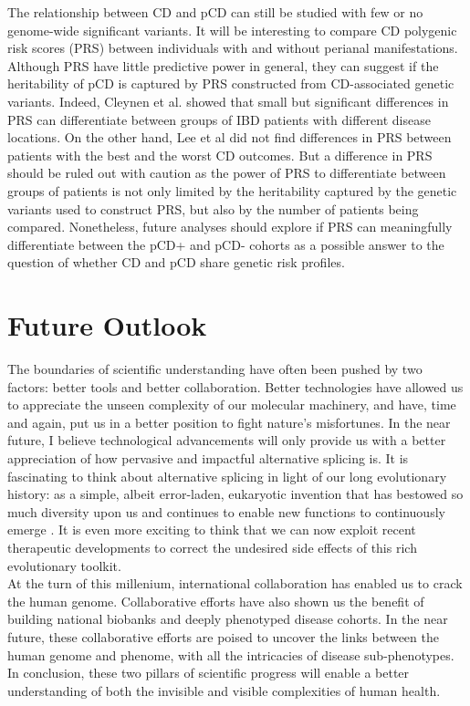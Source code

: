 The relationship between CD and pCD can still be studied with few or no genome-wide significant variants. It will be interesting to compare CD polygenic risk scores (PRS) between individuals with and without perianal manifestations. Although PRS have little predictive power in general, they can suggest if the heritability of pCD is captured by PRS constructed from CD-associated genetic variants. Indeed, Cleynen et al. \cite{Cleynen2016-ha} showed that small but significant differences in PRS can differentiate between groups of IBD patients with different disease locations. On the other hand, Lee et al \cite{Lee2017-tl} did not find differences in PRS between patients with the best and the worst CD outcomes. But a difference in PRS should be ruled out with caution as the power of PRS to differentiate between groups of patients is not only limited by the heritability captured by the genetic variants used to construct PRS, but also by the number of patients being compared. Nonetheless, future analyses should explore if PRS can meaningfully differentiate between the pCD+ and pCD- cohorts as a possible answer to the question of whether CD and pCD share genetic risk profiles.

\section{Future Outlook}
The boundaries of scientific understanding have often been pushed by two factors: better tools and better collaboration. Better technologies have allowed us to appreciate the unseen complexity of our molecular machinery, and have, time and again, put us in a better position to fight nature's misfortunes. In the near future, I believe technological advancements will only provide us with a better appreciation of how pervasive and impactful alternative splicing is. It is fascinating to think about alternative splicing in light of our long evolutionary history: as a simple, albeit error-laden, eukaryotic invention that has bestowed so much diversity upon us and continues to enable new functions to continuously emerge \cite{Deininger2011-sw,Zarnack2013-in,Xing2006-iv,Fedorova2003-sm}. It is even more exciting to think that we can now exploit recent therapeutic developments to correct the undesired side effects of this rich evolutionary toolkit.\\

At the turn of this millenium, international collaboration has enabled us to crack the human genome. Collaborative efforts have also shown us the benefit of building national biobanks and deeply phenotyped disease cohorts. In the near future, these collaborative efforts are poised to uncover the links between the human genome and phenome, with all the intricacies of disease sub-phenotypes. In conclusion, these two pillars of scientific progress will enable a better understanding of both the invisible and visible complexities of human health. 

